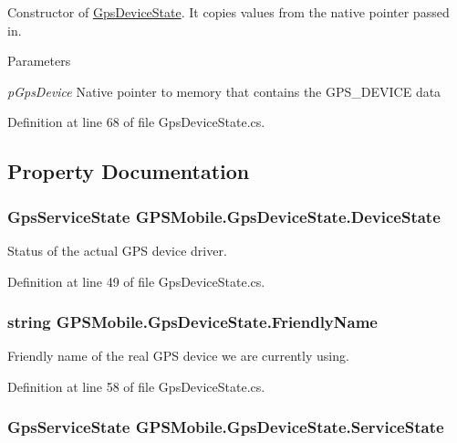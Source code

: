 Constructor of \hyperlink{class_g_p_s_mobile_1_1_gps_device_state}{GpsDeviceState}. It copies values from the native pointer passed in. 
\begin{DoxyParams}{Parameters}
\item[{\em pGpsDevice}]Native pointer to memory that contains the GPS\_\-DEVICE data\end{DoxyParams}


Definition at line 68 of file GpsDeviceState.cs.

\subsection{Property Documentation}
\hypertarget{class_g_p_s_mobile_1_1_gps_device_state_a95d80e824e8df9444a76608d6767c4da}{
\subsubsection[{DeviceState}]{\setlength{\rightskip}{0pt plus 5cm}GpsServiceState GPSMobile.GpsDeviceState.DeviceState}}
\label{class_g_p_s_mobile_1_1_gps_device_state_a95d80e824e8df9444a76608d6767c4da}


Status of the actual GPS device driver. 

Definition at line 49 of file GpsDeviceState.cs.\hypertarget{class_g_p_s_mobile_1_1_gps_device_state_a8e4ee60285e5ae875c3999aa56ef3510}{
\subsubsection[{FriendlyName}]{\setlength{\rightskip}{0pt plus 5cm}string GPSMobile.GpsDeviceState.FriendlyName}}
\label{class_g_p_s_mobile_1_1_gps_device_state_a8e4ee60285e5ae875c3999aa56ef3510}


Friendly name of the real GPS device we are currently using. 

Definition at line 58 of file GpsDeviceState.cs.\hypertarget{class_g_p_s_mobile_1_1_gps_device_state_aa6ae395d7f3d97e5ec218882aa673ef6}{
\subsubsection[{ServiceState}]{\setlength{\rightskip}{0pt plus 5cm}GpsServiceState GPSMobile.GpsDeviceState.ServiceState}}
\label{class_g_p_s_mobile_1_1_gps_device_state_aa6ae395d7f3d97e5ec218882aa673ef6}


